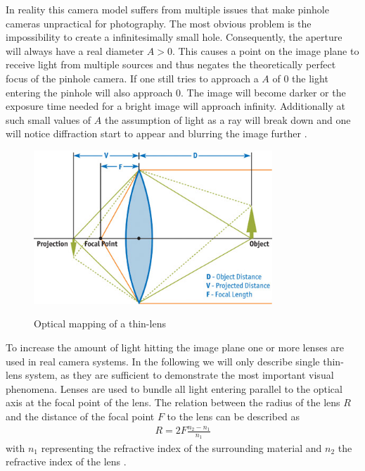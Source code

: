 In reality this camera model suffers from multiple issues that make pinhole cameras unpractical for photography.
The most obvious problem is the impossibility to create a infinitesimally small hole.
Consequently, the aperture will always have a real diameter $A > 0$.
This causes a point on the image plane to receive light from multiple sources and thus negates the theoretically perfect focus of the pinhole camera.
If one still tries to approach a $A$ of $0$ the light entering the pinhole will also approach $0$.
The image will become darker or the exposure time needed for a bright image will approach infinity.
Additionally at such small values of $A$ the assumption of light as a ray will break down and one will notice diffraction start to appear and blurring the image further \cite{Beyerer.2016}.

\begin{figure}[h]
    \centering
    \includegraphics[width=0.8\textwidth]{images/fig23-01_1.png}
    \caption{Optical mapping of a thin-lens}
    \label{fig:thin-lens}
    \cite{Demers.2005}
\end{figure}

To increase the amount of light hitting the image plane one or more lenses are used in real camera systems.
In the following we will only describe single thin-lens system, as they are sufficient to demonstrate the most important visual phenomena.
Lenses are used to bundle all light entering parallel to the optical axis at the focal point of the lens.
The relation between the radius of the lens $R$ and the distance of the focal point $F$ to the lens can be described as
\begin{align}
    R = 2 F \frac{n_2 - n_1}{n_1}
\end{align}
with $n_1$ representing the refractive index of the surrounding material and $n_2$ the refractive index of the lens \cite{Beyerer.2016}.

